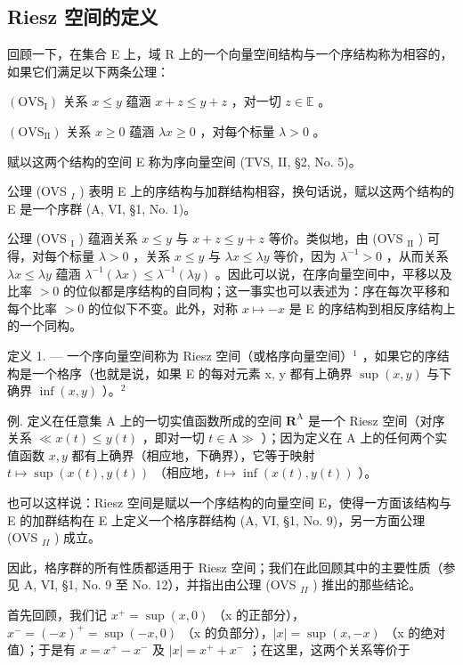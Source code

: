 \subsection{Riesz 空间的定义}

回顾一下，在集合 E 上，域 R 上的一个向量空间结构与一个序结构称为相容的，如果它们满足以下两条公理：

\((\mathrm{OVS}_{\mathrm{I}})\) 关系 \(x \leqslant y\) 蕴涵 \(x + z \leqslant y + z\) ，对一切 \(z \in \mathbb{E}\) 。

\((\mathrm{OVS}_{\mathrm{II}})\) 关系 \(x \geqslant 0\) 蕴涵 \(\lambda x \geqslant 0\) ，对每个标量 \(\lambda > 0\) 。

赋以这两个结构的空间 E 称为序向量空间 (TVS, II, §2, No. 5)。

公理 (OVS \(_{I}\) ) 表明 E 上的序结构与加群结构相容，换句话说，赋以这两个结构的 E 是一个序群 (A, VI, §1, No. 1)。

公理 (OVS \(_{\text{I}}\) ) 蕴涵关系 \(x \leqslant y\) 与 \(x + z \leqslant y + z\) 等价。类似地，由 (OVS \(_{\text{II}}\) ) 可得，对每个标量 \(\lambda > 0\) ，关系 \(x \leqslant y\) 与 \(\lambda x \leqslant \lambda y\) 等价，因为 \(\lambda^{-1} > 0\) ，从而关系 \(\lambda x \leqslant \lambda y\) 蕴涵 \(\lambda^{-1}(\lambda x) \leqslant \lambda^{-1}(\lambda y)\) 。因此可以说，在序向量空间中，平移以及比率 \(> 0\) 的位似都是序结构的自同构；这一事实也可以表述为：序在每次平移和每个比率 \(> 0\) 的位似下不变。此外，对称 \(x \mapsto -x\) 是 E 的序结构到相反序结构上的一个同构。

定义 1. --- 一个序向量空间称为 Riesz 空间（或格序向量空间）\(^{1}\) ，如果它的序结构是一个格序（也就是说，如果 E 的每对元素 x, y 都有上确界 \(\sup(x,y)\) 与下确界 \(\inf(x,y)\) ）。\(^{2}\)

例. 定义在任意集 A 上的一切实值函数所成的空间 \(\mathbf{R}^{\mathrm{A}}\) 是一个 Riesz 空间（对序关系 \(\ll x(t) \leqslant y(t)\) ，即对一切 \(t \in \mathrm{A} \gg\) ）；因为定义在 A 上的任何两个实值函数 \(x, y\) 都有上确界（相应地，下确界），它等于映射 \(t \mapsto \sup(x(t), y(t))\) （相应地，\(t \mapsto \inf(x(t), y(t))\) ）。

也可以这样说：Riesz 空间是赋以一个序结构的向量空间 E，使得一方面该结构与 E 的加群结构在 E 上定义一个格序群结构 (A, VI, §1, No. 9)，另一方面公理 (OVS \(_{II}\) ) 成立。

因此，格序群的所有性质都适用于 Riesz 空间；我们在此回顾其中的主要性质（参见 A, VI, §1, No. 9 至 No. 12），并指出由公理 (OVS \(_{II}\) ) 推出的那些结论。

首先回顾，我们记 \(x^{+} = \sup(x,0)\) （x 的正部分），\(x^{-} = (-x)^{+} = \sup(-x,0)\) （x 的负部分），\(|x| = \sup(x,-x)\) （x 的绝对值）；于是有 \(x = x^{+} - x^{-}\) 及 \(|x| = x^{+} + x^{-}\) ；在这里，这两个关系等价于

